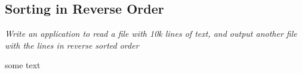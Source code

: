 \subsection{Sorting in Reverse Order}
\textit{Write an application to read a file with 10k lines of text, and output another file with the lines in reverse sorted order}

some text

